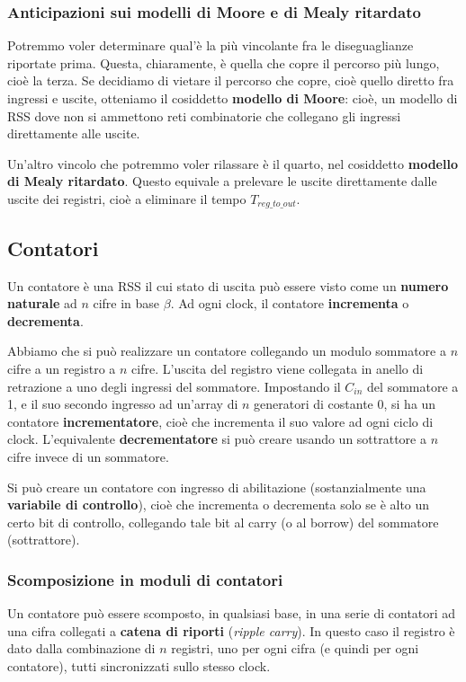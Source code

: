 \documentclass[a4paper,11pt]{article}
\begin{document}
\subsubsection{Anticipazioni sui modelli di Moore e di Mealy ritardato}
Potremmo voler determinare qual'è la più vincolante fra le diseguaglianze riportate prima.
Questa, chiaramente, è quella che copre il percorso più lungo, cioè la terza.
Se decidiamo di vietare il percorso che copre, cioè quello diretto fra ingressi e uscite, otteniamo il cosiddetto \textbf{modello di Moore}: cioè, un modello di RSS dove non si ammettono reti combinatorie che collegano gli ingressi direttamente alle uscite.

Un'altro vincolo che potremmo voler rilassare è il quarto, nel cosiddetto \textbf{modello di Mealy ritardato}.
Questo equivale a prelevare le uscite direttamente dalle uscite dei registri, cioè a eliminare il tempo $T_{reg\_to\_out}$.

\subsection{Contatori}
Un contatore è una RSS il cui stato di uscita può essere visto come un \textbf{numero naturale} ad $n$ cifre in base $\beta$.
Ad ogni clock, il contatore \textbf{incrementa} o \textbf{decrementa}.

Abbiamo che si può realizzare un contatore collegando un modulo sommatore a $n$ cifre a un registro a $n$ cifre.
L'uscita del registro viene collegata in anello di retrazione a uno degli ingressi del sommatore.
Impostando il $C_{in}$ del sommatore a 1, e il suo secondo ingresso ad un'array di $n$ generatori di costante 0, si ha un contatore \textbf{incrementatore}, cioè che incrementa il suo valore ad ogni ciclo di clock.
L'equivalente \textbf{decrementatore} si può creare usando un sottrattore a $n$ cifre invece di un sommatore.

Si può creare un contatore con ingresso di abilitazione (sostanzialmente una \textbf{variabile di controllo}), cioè che incrementa o decrementa solo se è alto un certo bit di controllo, collegando tale bit al carry (o al borrow) del sommatore (sottrattore).

\subsubsection{Scomposizione in moduli di contatori}
Un contatore può essere scomposto, in qualsiasi base, in una serie di contatori ad una cifra collegati a \textbf{catena di riporti} (\textit{ripple carry}).
In questo caso il registro è dato dalla combinazione di $n$ registri, uno per ogni cifra (e quindi per ogni contatore), tutti sincronizzati sullo stesso clock.
\end{document}
